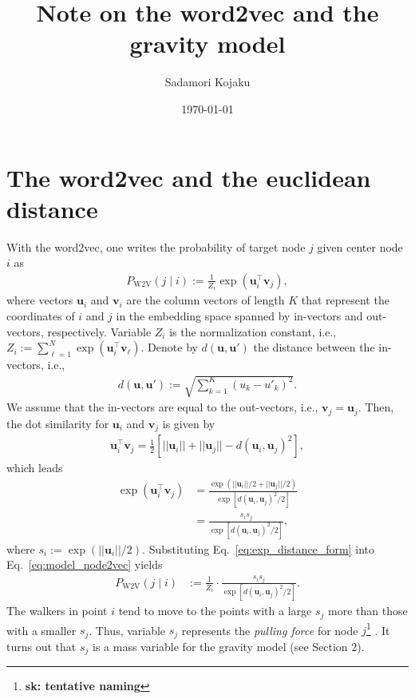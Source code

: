 \documentclass[12pt]{article} %
\def\given{\mid}
\def\vec#1{{\bm #1}}
\def\sada#1{\footnote{\color{light-blue}\textbf{sk: #1}} }
\begin{document}

\title{Note on the word2vec and the gravity model} %
\date{\today}
\author{Sadamori Kojaku}
\maketitle %

\section{The word2vec and the euclidean distance}

With the word2vec, one writes the probability of target node $j$ given center node $i$ as 
\begin{align}
  \label{eq:model_node2vec}
    P_{\text{W2V}}\left(j \given i\right) := \frac{1}{Z_i}\exp\left(\vec{u} ^\top _{i} \vec{v}_{j}\right), 
\end{align}
where vectors $\vec{u}_i$ and $\vec{v}_i$ are the column vectors of length $K$ that represent the coordinates of $i$ and $j$ in the embedding space spanned by in-vectors and out-vectors, respectively.
Variable $Z_i$ is the normalization constant, i.e., $Z_i:= \sum_{\ell=1}^N \exp\left(\vec{u} ^\top _{i} \vec{v}_{\ell}\right)$. 
Denote by $d(\vec{u},\vec{u}')$ the distance between the in-vectors, i.e., 
\begin{align}
    \label{eq:distance}
    d(\vec{u},\vec{u}'):= \sqrt{\sum_{k=1}^K \left(u_{k} - u'_{k}\right)^2}.
\end{align}
We assume that the in-vectors are equal to the out-vectors, i.e., $\vec{v}_j = \vec{u}_j$.
Then, the dot similarity for $\vec{u}_i$ and $\vec{v}_j$ is given by 
\begin{align}
    \label{eq:dotsim}
    \vec{u}_i ^\top \vec{v}_j = \frac{1}{2}\left[ ||\vec{u}_i|| + ||\vec{u}_j|| - d\left(\vec{u}_i, \vec{u}_j\right)^2 \right],
\end{align}
which leads 
\begin{align}
    \exp\left( \vec{u}_i ^\top \vec{v}_j \right) &= \frac{\exp\left( ||\vec{u}_i||/2 + ||\vec{u}_j||/2 \right)}{\exp\left[ d\left(\vec{u}_i, \vec{u}_j\right)^2 / 2 \right]} \nonumber \\
                                                 &= \frac{s_i s_j}{\exp\left[d\left(\vec{u}_i, \vec{u}_j\right)^2 / 2\right]}, \label{eq:exp_distance_form}
\end{align}
where $s_i:=\exp(||\vec{u}_i||/2)$. 
Substituting Eq.~\eqref{eq:exp_distance_form} into Eq.~\eqref{eq:model_node2vec} yields
\begin{align}
    \label{eq:model_node2vec_distance}
    P_{\text{W2V}}\left(j \given i\right) &:= \frac{1}{Z_i}\cdot \frac{s_is_j}{\exp\left[d\left(\vec{u}_i, \vec{u}_j\right)^2/2\right]}. 
\end{align}
The walkers in point $i$ tend to move to the points with a large $s_j$ more than those with a smaller $s_j$.
Thus, variable $s_j$ represents the {\it pulling force} for node $j$\sada{tentative naming}. 
It turns out that $s_j$ is a mass variable for the gravity model (see Section 2). 
\end{document}
